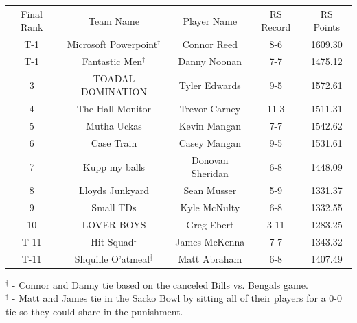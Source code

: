\documentclass[11pt,letterpaper]{article}
\begin{document}
\vspace{-25pt}
\begin{table} [h]
\begin{center}
\begin{tabular} { c c c c c }
\\ Final Rank & Team Name & Player Name & RS Record & RS Points
\\ T-1 & Microsoft Powerpoint$^\dag$ & Connor Reed & 8-6 & 1609.30
\\ T-1 & Fantastic Men$^\dag$ & Danny Noonan & 7-7 & 1475.12
\\ 3 & TOADAL DOMINATION & Tyler Edwards & 9-5 & 1572.61
\\ 4 & The Hall Monitor & Trevor Carney & 11-3 & 1511.31
\\ 5 & Mutha Uckas & Kevin Mangan & 7-7 & 1542.62
\\ 6 & Case Train & Casey Mangan & 9-5 & 1531.61
\\ 7 & Kupp my balls & Donovan Sheridan & 6-8 & 1448.09
\\ 8 & Lloyds Junkyard & Sean Musser & 5-9 & 1331.37
\\ 9 & Small TDs & Kyle McNulty & 6-8 & 1332.55
\\ 10 & LOVER BOYS& Greg Ebert & 3-11 & 1283.25
\\ T-11 & Hit Squad$^\ddag$ & James McKenna & 7-7 & 1343.32
\\ T-11 & Shquille O'atmeal$^\ddag$ & Matt Abraham & 6-8 & 1407.49
\end{tabular}
\end{center}
\noindent$^\dag$ - Connor and Danny tie based on the canceled Bills vs. Bengals game.
\\\noindent$^\ddag$ - Matt and James tie in the Sacko Bowl by sitting all of their players for a 0-0 tie so they could share in the punishment.
\end{table}
\end{document}
